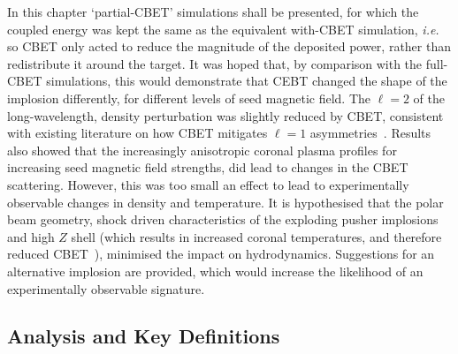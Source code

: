 In this chapter `partial-\ac{CBET}' simulations shall be presented, for which the coupled energy was kept the same as the equivalent with-\ac{CBET} simulation, \textit{i.e.} so \ac{CBET} only acted to reduce the magnitude of the deposited power, rather than redistribute it around the target.
It was hoped that, by comparison with the full-\ac{CBET} simulations, this would demonstrate that \ac{CEBT} changed the shape of the implosion differently, for different levels of seed magnetic field.
The $\ell=2$ of the long-wavelength, density perturbation was slightly reduced by \ac{CBET}, consistent with existing literature on how \ac{CBET} mitigates $\ell=1$ asymmetries~\cite{colaitis_inverse_2021}.
Results also showed that the increasingly anisotropic coronal plasma profiles for increasing seed magnetic field strengths, did lead to changes in the \ac{CBET} scattering.
However, this was too small an effect to lead to experimentally observable changes in density and temperature.
It is hypothesised that the polar beam geometry, shock driven characteristics of the exploding pusher implosions and high $Z$ shell (which results in increased coronal temperatures, and therefore reduced \ac{CBET}~\cite{colaitis_exploration_2023}), minimised the impact on hydrodynamics.
Suggestions for an alternative implosion are provided, which would increase the likelihood of an experimentally observable signature.

\subsection{Analysis and Key Definitions}%
\label{sec:Res2_analysis_definitions}

